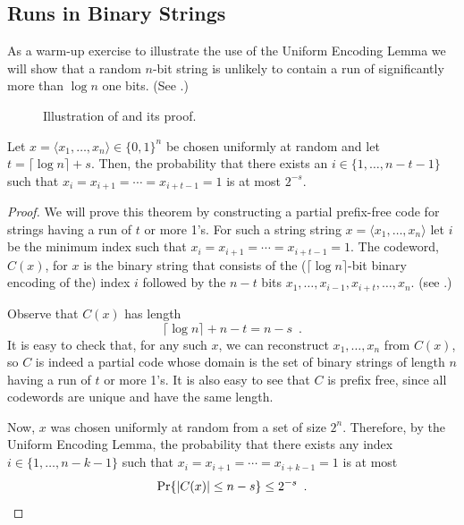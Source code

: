 \documentclass{patmorin}
\begin{document}
\subsection{Runs in Binary Strings}

As a warm-up exercise to illustrate the use of the Uniform Encoding
Lemma we will show that a random $n$-bit string is unlikely to contain
a run of significantly more than $\log n$ one bits.  (See .)

\begin{figure}
  \caption{Illustration of  and its proof.}
\end{figure}

\begin{thm}
  Let $x=\langle x_1,\ldots,x_n\rangle\in\{0,1\}^n$ be chosen
  uniformly at random and let $t=\lceil\log n\rceil + s$. Then, the
  probability that there exists an $i\in\{1,\ldots,n-t-1\}$ such that
  $x_i=x_{i+1}=\cdots=x_{i+t-1}=1$ is at most $2^{-s}$.
\end{thm}

\begin{proof}
  We will prove this theorem by constructing a partial prefix-free
  code for strings having a run of $t$ or more 1's.  For such a string
  string $x=\langle x_1,\ldots,x_n\rangle$ let $i$ be the minimum index
  such that $x_i=x_{i+1}=\cdots=x_{i+t-1}=1$. The codeword, $C(x)$,
  for $x$ is the binary string that consists of the ($\lceil\log
   n\rceil$-bit binary encoding of the) index $i$ followed by the $n-t$
  bits $x_1,\ldots,x_{i-1},x_{i+t},\ldots,x_n$. (see .)

  Observe that $C(x)$ has length 
  \[
      \lceil\log n\rceil + n - t = n-s \enspace .
  \]
  It is easy to check that, for any such $x$, we can reconstruct
  $x_1,\ldots,x_n$ from $C(x)$, so $C$ is indeed a partial code whose
  domain is the set of binary strings of length $n$ having a run of
  $t$ or more 1's.  It is also easy to see that $C$ is prefix free,
  since all codewords are unique and have the same length.

  Now, $x$ was chosen uniformly at random from a set of size $2^{n}$.
  Therefore, by the Uniform Encoding Lemma, the probability that there
  exists any index $i\in\{1,\ldots,n-k-1\}$ such that
  $x_i=x_{i+1}=\cdots=x_{i+k-1}=1$ is at most
  \[
      \Pr\{|C(x)|\le n-s\} \le 2^{-s} \enspace . \qedhere 
  \]
\end{proof}
\end{document}
